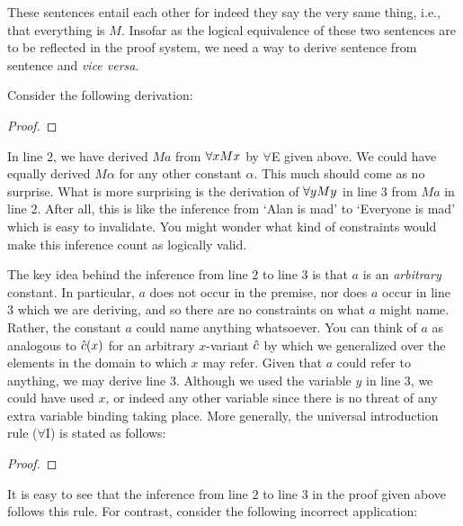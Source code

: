 These sentences entail each other for indeed they say the very same thing, i.e., that everything is $M$.
Insofar as the logical equivalence of these two sentences are to be reflected in the proof system, we need a way to derive sentence  from sentence  and \textit{vice versa}.

Consider the following derivation:

\begin{proof}
	 \pr{}
	 
	 
\end{proof}

In line $2$, we have derived $Ma$ from $\forall xMx$ by $\forall$E given above.
We could have equally derived $M\alpha$ for any other constant $\alpha$.
This much should come as no surprise.
What is more surprising is the derivation of $\forall yMy$ in line $3$ from $Ma$ in line $2$.
After all, this is like the inference from `Alan is mad' to `Everyone is mad' which is easy to invalidate.
You might wonder what kind of constraints would make this inference count as logically valid.

The key idea behind the inference from line $2$ to line $3$ is that $a$ is an \textit{arbitrary} constant. 
In particular, $a$ does not occur in the premise, nor does $a$ occur in line $3$ which we are deriving, and so there are no constraints on what $a$ might name. 
Rather, the constant $a$ could name anything whatsoever. 
You can think of $a$ as analogous to $\hat{c}(x)$ for an arbitrary $x$-variant $\hat{c}$ by which we generalized over the elements in the domain to which $x$ may refer.
Given that $a$ could refer to anything, we may derive line $3$.
Although we used the variable $y$ in line $3$, we could have used $x$, or indeed any other variable since there is no threat of any extra variable binding taking place.
More generally, the universal introduction rule ($\forall$I) is stated as follows:

\begin{proof}
     
   
\end{proof}

It is easy to see that the inference from line $2$ to line $3$ in the proof given above follows this rule.
For contrast, consider the following incorrect application:

